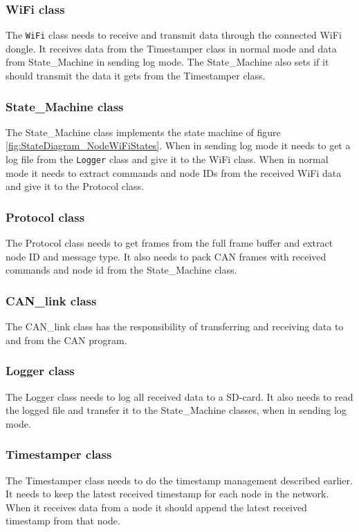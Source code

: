 \subsubsection*{WiFi class}
The \texttt{WiFi} class needs to receive and transmit data through the connected WiFi dongle.
It receives data from the Timestamper class in normal mode and data from State\_Machine in sending log mode.
The State\_Machine also sets if it should transmit the data it gets from the Timestamper class. 

\subsubsection*{State\_Machine class}
The State\_Machine class implements the state machine of figure \ref{fig:StateDiagram_NodeWiFiStates}.
When in sending log mode it needs to get a log file from the \texttt{Logger} class and give it to the WiFi class.
When in normal mode it needs to extract commands and node IDs from the received WiFi data and give it to the Protocol class.

\subsubsection*{Protocol class}
The Protocol class needs to get frames from the full frame buffer and extract node ID and message type. 
It also needs to pack CAN frames with received commands and node id from the State\_Machine class.

\subsubsection*{CAN\_link class}
The CAN\_link class has the responsibility of transferring and receiving data to
and from the CAN program.

\subsubsection*{Logger class}
The Logger class needs to log all received data to a SD-card.
It also needs to read the logged file and transfer it to the State\_Machine classes, when in sending log mode.

\subsubsection*{Timestamper class}
The Timestamper class needs to do the timestamp management described earlier.
It needs to keep the latest received timestamp for each node in the network.
When it receives data from a node it should append the latest received timestamp from that node.  

